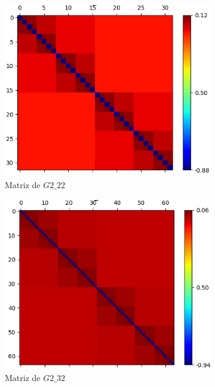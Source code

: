 
\begin{figure}
	\begin{subfigure}{.6\textwidth}
		\centering
		\includegraphics[width=.8\linewidth]{img/matrix/matrixG2_22}
		\caption{Matriz de $\mathit{G2\_22}$}
		\label{fig:sfig1}
	\end{subfigure}%
	\begin{subfigure}{.6\textwidth}
		\centering
		\includegraphics[width=.8\linewidth]{img/matrix/matrixG2_32}
		\caption{Matriz de $\mathit{G2\_32}$}
		\label{fig:sfig2}
	\end{subfigure}
	\begin{subfigure}{.6\textwidth}

\end{subfigure}
\end{figure}
